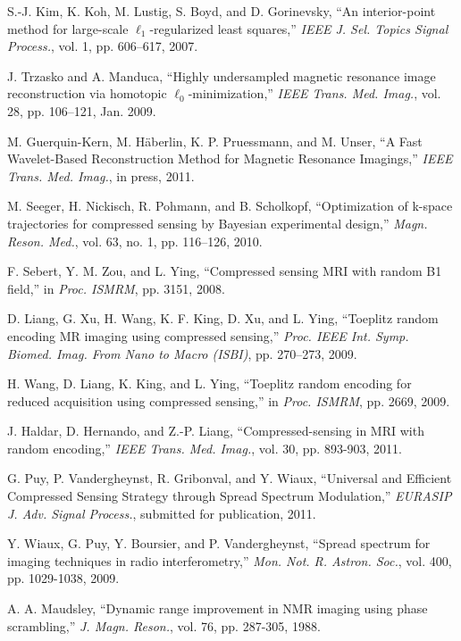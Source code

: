 \documentclass[10pt,draftcls, onecolumn]{IEEEtran}
\begin{document}
\begin{thebibliography}{}
S.-J. Kim, K. Koh, M. Lustig, S. Boyd, and D. Gorinevsky, ``An interior-point method for large-scale $\ell_1$-regularized least squares,'' \emph{IEEE J. Sel. Topics Signal Process.}, vol. 1, pp. 606–617, 2007.

J. Trzasko and A. Manduca, ``Highly undersampled magnetic resonance image reconstruction via homotopic $\ell_0$-minimization,'' \emph{IEEE Trans. Med. Imag.}, vol. 28, pp. 106–121, Jan. 2009.

M. Guerquin-Kern, M. H\"aberlin, K. P. Pruessmann, and M. Unser, ``A Fast Wavelet-Based Reconstruction Method for Magnetic Resonance Imagings,'' \emph{IEEE Trans. Med. Imag.}, in press, 2011.

M. Seeger, H. Nickisch, R. Pohmann, and B. Scholkopf, ``Optimization of k-space trajectories for compressed sensing by Bayesian experimental design,'' \emph{Magn. Reson. Med.}, vol. 63, no. 1, pp. 116–126, 2010.

F. Sebert, Y. M. Zou, and L. Ying, ``Compressed sensing MRI with random B1 field,'' in \emph{Proc. ISMRM}, pp. 3151, 2008.

D. Liang, G. Xu, H. Wang, K. F. King, D. Xu, and L. Ying, ``Toeplitz random encoding MR imaging using compressed sensing,'' \emph{Proc. IEEE Int. Symp. Biomed. Imag. From Nano to Macro (ISBI)}, pp. 270–273, 2009.

H. Wang, D. Liang, K. King, and L. Ying, ``Toeplitz random encoding for reduced acquisition using compressed sensing,'' in \emph{Proc. ISMRM}, pp. 2669, 2009.

J. Haldar, D. Hernando, and Z.-P. Liang, ``Compressed-sensing in MRI with random encoding,'' \emph{IEEE Trans. Med. Imag.}, vol. 30, pp. 893-903, 2011.

G. Puy, P. Vandergheynst, R. Gribonval, and Y. Wiaux, ``Universal and Efficient Compressed Sensing Strategy through Spread Spectrum Modulation,'' \emph{EURASIP J. Adv. Signal Process.}, submitted for publication, 2011.

Y. Wiaux, G. Puy, Y. Boursier, and P. Vandergheynst, ``Spread spectrum for imaging techniques in radio interferometry,'' \emph{Mon. Not. R. Astron. Soc.}, vol. 400, pp. 1029-1038, 2009.

A. A. Maudsley, ``Dynamic range improvement in NMR imaging using phase scrambling,'' \emph{J. Magn. Reson.}, vol. 76, pp. 287-305, 1988.


\end{thebibliography}
\end{document}
